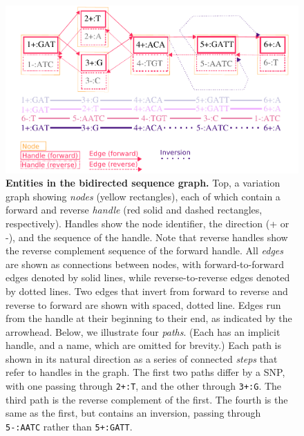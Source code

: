 \documentclass{article}
\begin{document}


\FloatBarrier

\begin{figure}
	\begin{center}
		\includegraphics[width=1.0\textwidth]{figures/GRaphchrXpaper.pdf}
	\end{center}
	\caption{{\label{fig:graph}
        \textbf{Entities in the bidirected sequence graph.}
        Top, a variation graph showing \emph{nodes} (yellow rectangles), each of which contain a forward and reverse \emph{handle} (red solid and dashed rectangles, respectively).
        Handles show the node identifier, the direction (+ or -), and the sequence of the handle.
        Note that reverse handles show the reverse complement sequence of the forward handle.
        All \emph{edges} are shown as connections between nodes, with forward-to-forward edges denoted by solid lines, while reverse-to-reverse edges denoted by dotted lines.
        Two edges that invert from forward to reverse and reverse to forward are shown with spaced, dotted line.
        Edges run from the handle at their beginning to their end, as indicated by the arrowhead.
        Below, we illustrate four \emph{paths}.
        (Each has an implicit handle, and a name, which are omitted for brevity.)
        Each path is shown in its natural direction as a series of connected \emph{steps} that refer to handles in the graph.
        The first two paths differ by a SNP, with one passing through \texttt{2+:T}, and the other through \texttt{3+:G}.
        The third path is the reverse complement of the first.
        The fourth is the same as the first, but contains an inversion, passing through \texttt{5-:AATC} rather than \texttt{5+:GATT}.
      }
    }
\end{figure}
\end{document}
